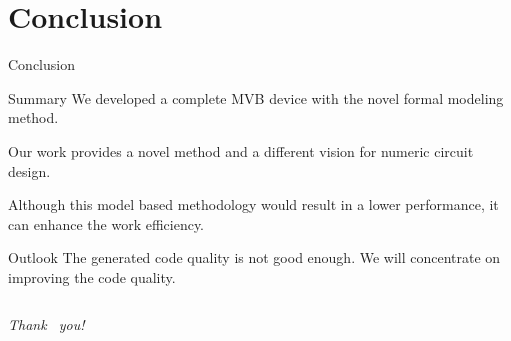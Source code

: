\documentclass[12pt,beamer]{beamer}
\begin{document}
\section{Conclusion}
\begin{frame}{Conclusion}

\begin{block}{Summary}
We developed a complete MVB device with the novel formal modeling method. 

Our work provides a novel method and a different vision for numeric circuit design. 

Although this model based methodology would result in a lower performance, it can enhance the work efficiency.

\end{block}

\begin{block}{Outlook}
The generated code quality is not good enough.
We will concentrate on improving the code quality. 
\end{block}

\end{frame}

\begin{frame}[c]
	\centering
	\begin{columns}
			{\huge \emph{{Thank  ~you!}}}\\
	\end{columns}
\end{frame}
\end{document}
